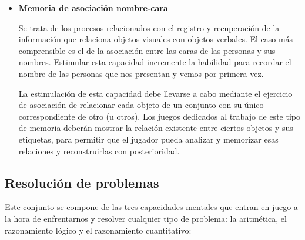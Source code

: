 \begin{itemize}
\item {\bf Memoria de asociación nombre-cara}

Se trata de los procesos relacionados con el registro y recuperación de la información que relaciona objetos visuales con objetos verbales. El caso más comprensible es el de la asociación entre las caras de las personas y sus nombres. Estimular esta capacidad incremente la habilidad para recordar el nombre de las personas que nos presentan y vemos por primera vez.

La estimulación de esta capacidad debe llevarse a cabo mediante el ejercicio de asociación de relacionar cada objeto de un conjunto con su único correspondiente de otro (u otros). Los juegos dedicados al trabajo de este tipo de memoria deberán mostrar la relación existente entre ciertos objetos y sus etiquetas, para permitir que el jugador pueda analizar y memorizar esas relaciones y reconstruirlas con posterioridad.

\end{itemize}

\subsection{Resolución de problemas}

Este conjunto se compone de las tres capacidades mentales que entran en juego a la hora de enfrentarnos y resolver cualquier tipo de problema: la aritmética, el razonamiento lógico y el razonamiento cuantitativo:

